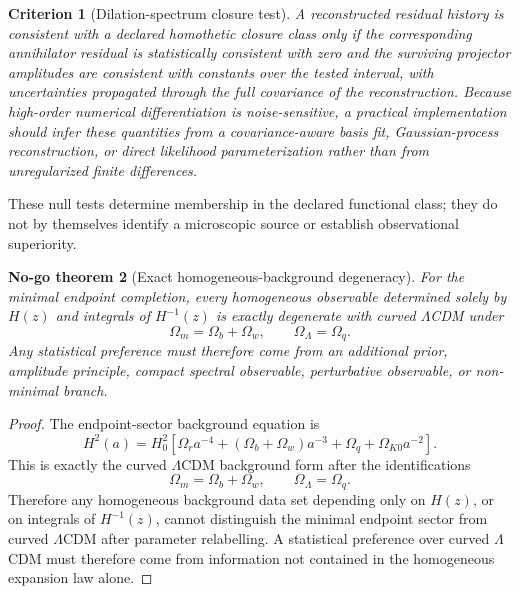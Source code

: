 \documentclass[11pt,a4paper]{article}
\numberwithin{equation}{section}
\newtheorem{criterion}{Criterion}
\newtheorem{nogotheorem}[criterion]{No-go theorem}
\theoremstyle{remark}
\begin{document}
\begin{criterion}[Dilation-spectrum closure test]
A reconstructed residual history is consistent with a declared homothetic closure class only if the corresponding annihilator residual is statistically consistent with zero and the surviving projector amplitudes are consistent with constants over the tested interval, with uncertainties propagated through the full covariance of the reconstruction. Because high-order numerical differentiation is noise-sensitive, a practical implementation should infer these quantities from a covariance-aware basis fit, Gaussian-process reconstruction, or direct likelihood parameterization rather than from unregularized finite differences.
\end{criterion}

These null tests determine membership in the declared functional class; they do not by themselves identify a microscopic source or establish observational superiority.

\begin{nogotheorem}[Exact homogeneous-background degeneracy]
For the minimal endpoint completion, every homogeneous observable determined solely by \(H(z)\) and integrals of \(H^{-1}(z)\) is exactly degenerate with curved \(\Lambda\)CDM under
\begin{equation}
\Omega_m=\Omega_b+\Omega_w,
\qquad
\Omega_\Lambda=\Omega_q .
\end{equation}
Any statistical preference must therefore come from an additional prior, amplitude principle, compact spectral observable, perturbative observable, or non-minimal branch.
\end{nogotheorem}

\begin{proof}
The endpoint-sector background equation is
\begin{equation}
H^2(a)=H_0^2\left[
\Omega_r a^{-4}
+(\Omega_b+\Omega_w)a^{-3}
+\Omega_q
+\Omega_{K0}a^{-2}
\right].
\end{equation}
This is exactly the curved \(\Lambda\)CDM background form after the identifications
\begin{equation}
\Omega_m=\Omega_b+\Omega_w,
\qquad
\Omega_\Lambda=\Omega_q.
\end{equation}
Therefore any homogeneous background data set depending only on \(H(z)\), or on integrals of \(H^{-1}(z)\), cannot distinguish the minimal endpoint sector from curved \(\Lambda\)CDM after parameter relabelling. A statistical preference over curved \(\Lambda\)CDM must therefore come from information not contained in the homogeneous expansion law alone.
\end{proof}
\end{document}
